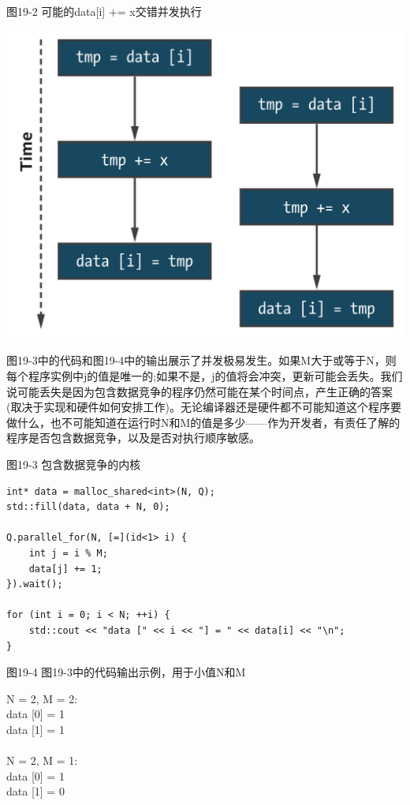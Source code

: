 \hspace*{\fill} \par %
图19-2 可能的data[i] += x交错并发执行
\begin{center}
	\includegraphics[width=1.0\textwidth]{content/chapter-19/images/3}
\end{center}

图19-3中的代码和图19-4中的输出展示了并发极易发生。如果M大于或等于N，则每个程序实例中j的值是唯一的;如果不是，j的值将会冲突，更新可能会丢失。我们说可能丢失是因为包含数据竞争的程序仍然可能在某个时间点，产生正确的答案(取决于实现和硬件如何安排工作)。无论编译器还是硬件都不可能知道这个程序要做什么，也不可能知道在运行时N和M的值是多少——作为开发者，有责任了解的程序是否包含数据竞争，以及是否对执行顺序敏感。\par

\hspace*{\fill} \par %
图19-3 包含数据竞争的内核
\begin{lstlisting}[caption={}]
int* data = malloc_shared<int>(N, Q);
std::fill(data, data + N, 0);

Q.parallel_for(N, [=](id<1> i) {
	int j = i % M;
	data[j] += 1;
}).wait();

for (int i = 0; i < N; ++i) {
	std::cout << "data [" << i << "] = " << data[i] << "\n";
}
\end{lstlisting}

\hspace*{\fill} \par %
图19-4 图19-3中的代码输出示例，用于小值N和M
\begin{tcolorbox}[colback=white,colframe=black]
N = 2, M = 2:\\
data [0] = 1\\
data [1] = 1\\
\\
N = 2, M = 1:\\
data [0] = 1\\
data [1] = 0
\end{tcolorbox}

